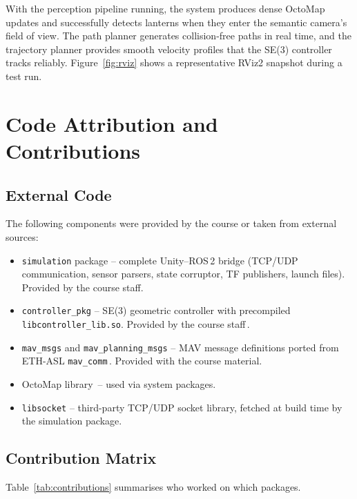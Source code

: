 \documentclass[twocolumn]{article}
\begin{document}
With the perception pipeline running, the system produces dense OctoMap updates and successfully detects lanterns when they enter the semantic camera's field of view.
The path planner generates collision-free paths in real time, and the trajectory planner provides smooth velocity profiles that the SE(3) controller tracks reliably.
Figure~\ref{fig:rviz} shows a representative RViz2 snapshot during a test run.

\section{Code Attribution and Contributions}

\subsection{External Code}

The following components were provided by the course or taken from external sources:
\begin{itemize}
  \item \texttt{simulation} package -- complete Unity--ROS\,2 bridge (TCP/UDP communication, sensor parsers, state corruptor, TF publishers, launch files). Provided by the course staff.
  \item \texttt{controller\_pkg} -- SE(3) geometric controller with precompiled \texttt{libcontroller\_lib.so}. Provided by the course staff\,\cite{Lee2010}.
  \item \texttt{mav\_msgs} and \texttt{mav\_planning\_msgs} -- MAV message definitions ported from ETH-ASL \texttt{mav\_comm}\,\cite{ETHmavcomm}. Provided with the course material.
  \item OctoMap library\,\cite{Hornung2013} -- used via system packages.
  \item \texttt{libsocket} -- third-party TCP/UDP socket library, fetched at build time by the simulation package.
\end{itemize}

\subsection{Contribution Matrix}

Table~\ref{tab:contributions} summarises who worked on which packages.
\end{document}
